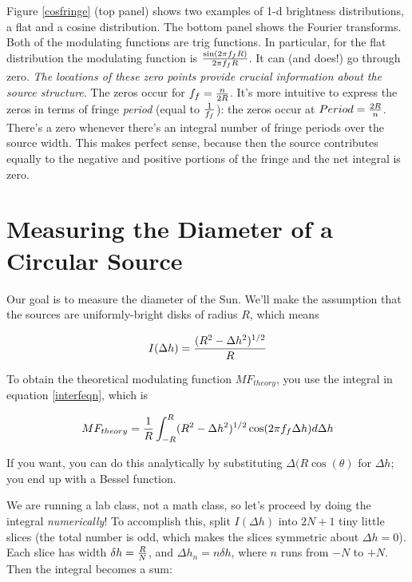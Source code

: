 \documentclass[11pt,preprint]{aastex}
\begin{document}
Figure \ref{cosfringe} (top panel) shows two examples of 1-d brightness
distributions, a flat and a cosine distribution.  The bottom panel shows
the Fourier transforms.  Both of the modulating functions are trig
functions. In particular, for the flat distribution the modulating
function is ${ \sin(2 \pi f_f R) \over 2 \pi f_f R}$. It can (and does!)
go through zero. {\it The locations of these zero points provide crucial
information about the source structure}. The zeros occur for $f_f={n
\over 2R}$. It's more intuitive to express the zeros in terms of fringe
{\it period} (equal to $1 \over f_f$): the zeros occur at $Period = {2R
\over n}$. There's a zero whenever there's an integral number of fringe
periods over the source width. This makes perfect sense, because then
the source contributes equally to the negative and positive portions of
the fringe and the net integral is zero.


\section{Measuring the Diameter of a Circular Source}

\noindent
Our goal is to measure the diameter of the Sun.
We'll make the assumption that the sources are uniformly-bright
disks of radius $R$, which means

\begin{equation}
I(\Delta h) = { (R^2 - \Delta h^2)^{1/2} \over  R}
\end{equation}

\noindent To obtain the theoretical modulating function $MF_{theory}$, you use the integral in
equation \ref{interfeqn}, which is

\begin{equation}
MF_{theory} = {1 \over R} \int_{-R}^R (R^2 - \Delta h^2)^{1/2} 
	\cos(2\pi f_f \Delta h) d \Delta h
\end{equation}

\noindent If you want, you can do this analytically by substituting
$\Delta (R \cos (\theta)$ for $\Delta h$; you end up with a Bessel
function.

We are running a lab class, not a math class, so let's proceed by doing
the integral {\it numerically}! To accomplish this, split $I(\Delta h)$
into $2N + 1$ tiny little slices (the total number is odd, which makes
the slices symmetric about $\Delta h = 0$). Each slice has width $\delta
h = {R \over N}$, and $\Delta h_n = n \delta h$, where $n$ runs from
$-N$ to $+N$. Then the integral becomes a sum:
\end{document}
